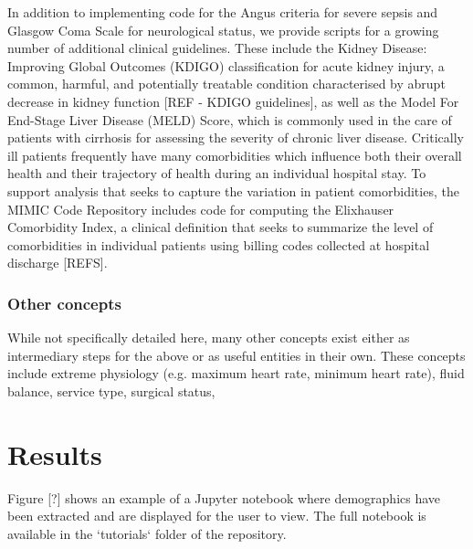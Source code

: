 \documentclass{elsart}
\begin{document}
In addition to implementing code for the Angus criteria for severe sepsis and Glasgow Coma Scale for neurological status, we provide scripts for a growing number of additional clinical guidelines. These include the Kidney Disease: Improving Global Outcomes (KDIGO) classification for acute kidney injury, a common, harmful, and potentially treatable condition characterised by abrupt decrease in kidney function [REF - KDIGO guidelines], as well as the Model For End-Stage Liver Disease (MELD) Score, which is commonly used in the care of patients with cirrhosis for assessing the severity of chronic liver disease. Critically ill patients frequently have many comorbidities which influence both their overall health and their trajectory of health during an individual hospital stay. To support analysis that seeks to capture the variation in patient comorbidities, the MIMIC Code Repository includes code for computing the Elixhauser Comorbidity Index, a clinical definition that seeks to summarize the level of comorbidities in individual patients using billing codes collected at hospital discharge [REFS].



\subsubsection{Other concepts}

While not specifically detailed here, many other concepts exist either as intermediary steps for the above or as useful entities in their own. These concepts include extreme physiology (e.g. maximum heart rate, minimum heart rate), fluid balance, service type, surgical status,


\section{Results}


Figure [?] shows an example of a Jupyter notebook where demographics have been extracted and are displayed for the user to view. The full notebook is available in the `tutorials` folder of the repository.

\end{document}
